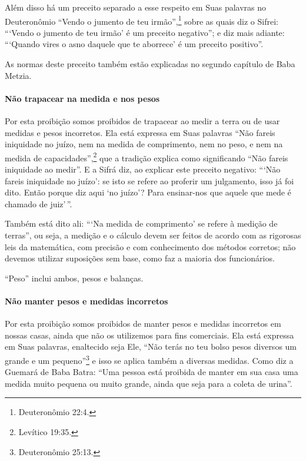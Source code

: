 Além disso há um preceito separado a esse respeito em Suas palavras no
Deuteronômio ``Vendo o jumento de teu irmão'',\footnote{Deuteronômio 22:4.} sobre
as quais diz o Sifrei: ```Vendo o jumento de teu irmão' é um preceito
negativo''; e diz mais adiante: ```Quando vires o asno daquele que te
aborrece' é um preceito positivo''.

As normas deste preceito também estão explicadas no segundo capítulo de
Baba Metzia.

\paragraph{Não trapacear na medida e nos pesos}

Por esta proibição somos proibidos de trapacear ao medir a terra ou de
usar medidas e pesos incorretos. Ela está expressa em Suas palavras
``Não fareis iniquidade no juízo, nem na medida de comprimento, nem no
peso, e nem na medida de capacidades'',\footnote{Levítico 19:35.} que a tradição
explica como significando ``Não fareis iniquidade ao medir''. E a Sifrá
diz, ao explicar este preceito negativo: ```Não fareis iniquidade no
juízo': se isto se refere ao proferir um julgamento, isso já foi dito.
Então porque diz aqui `no juízo'? Para ensinar-nos que aquele que mede é
chamado de juiz'\,''.

Também está dito ali: ```Na medida de comprimento' se refere à medição
de terras'', ou seja, a medição e o cálculo devem ser feitos de acordo
com as rigorosas leis da matemática, com precisão e com conhecimento dos
métodos corretos; não devemos utilizar suposições sem base, como faz a
maioria dos funcionários.

``Peso'' inclui ambos, pesos e balanças.

\paragraph{Não manter pesos e medidas incorretos}

Por esta proibição somos proibidos de manter pesos e medidas incorretos
em nossas casas, ainda que não os utilizemos para fins comerciais. Ela
está expressa em Suas palavras, enaltecido seja Ele, ``Não terás no teu
bolso pesos diversos um grande e um pequeno''\footnote{Deuteronômio 25:13.} e
isso se aplica também a diversas medidas. Como diz a Guemará de Baba
Batra: ``Uma pessoa está proibida de manter em sua casa uma medida muito
pequena ou muito grande, ainda que seja para a coleta de urina''.

